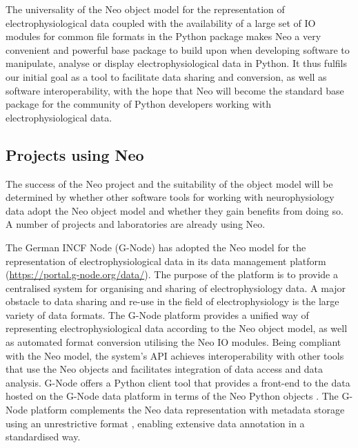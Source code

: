 \documentclass{frontiers}
\begin{document}
The universality of the Neo object model for the representation of electrophysiological data coupled with the availability of a large set of IO modules for common file formats in the Python package makes Neo a very convenient and powerful base package to build upon when developing software to manipulate, analyse or display electrophysiological data in Python.
It thus fulfils our initial goal as a tool to facilitate data sharing and conversion, as well as software interoperability, with the hope that Neo will become the standard base package for the community of Python developers working with electrophysiological data.

\subsection{Projects using Neo}

The success of the Neo project and the suitability of the object model will be determined by whether other software tools for working with neurophysiology data adopt the Neo object model and whether they gain benefits from doing so. A number of projects and laboratories are already using Neo.

The German INCF Node (G-Node) has adopted the Neo model for the representation of electrophysiological data in its data management platform (\url{https://portal.g-node.org/data/}).
The purpose of the platform is to provide a centralised system for organising and sharing of electrophysiology data.
A major obstacle to data sharing and re-use in the field of electrophysiology is the large variety of data formats.
The G-Node platform provides a unified way of representing electrophysiological data according to the Neo object model, as well as automated format conversion utilising the Neo IO modules.
Being compliant with the Neo model, the system's API achieves interoperability with other tools that use the Neo objects and facilitates integration of data access and data analysis.
G-Node offers a Python client tool that provides a front-end to the data hosted on the G-Node data platform in terms of the Neo Python objects \citep{Sobolev2014}.
The G-Node platform complements the Neo data representation with metadata storage using an unrestrictive format \citep{Grewe2011}, enabling extensive data annotation in a standardised way.
\end{document}
